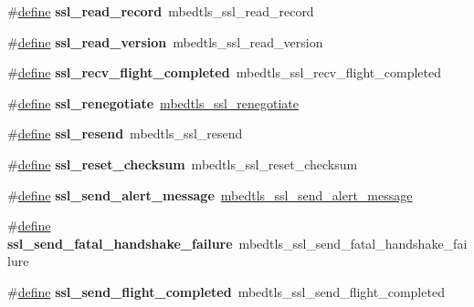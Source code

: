 \begin{DoxyCompactItemize}
\#\hyperlink{structdefine}{define} {\bfseries ssl\+\_\+read\+\_\+record}~mbedtls\+\_\+ssl\+\_\+read\+\_\+record
\item 
\mbox{\label{compat-1_83_8h_a5a530fd9e5a802238029b30f8ab7d2c8}} 
\#\hyperlink{structdefine}{define} {\bfseries ssl\+\_\+read\+\_\+version}~mbedtls\+\_\+ssl\+\_\+read\+\_\+version
\item 
\mbox{\label{compat-1_83_8h_a0368a3c941155088d189afef6c555a60}} 
\#\hyperlink{structdefine}{define} {\bfseries ssl\+\_\+recv\+\_\+flight\+\_\+completed}~mbedtls\+\_\+ssl\+\_\+recv\+\_\+flight\+\_\+completed
\item 
\mbox{\label{compat-1_83_8h_a5ab1cb88ad4ce08d9862dae7435a0348}} 
\#\hyperlink{structdefine}{define} {\bfseries ssl\+\_\+renegotiate}~\hyperlink{ssl_8h_a49b7a27a616495d5f0a4fabc3f550dbb}{mbedtls\+\_\+ssl\+\_\+renegotiate}
\item 
\mbox{\label{compat-1_83_8h_a70d8b31b1c74670701e22c3bbeffc563}} 
\#\hyperlink{structdefine}{define} {\bfseries ssl\+\_\+resend}~mbedtls\+\_\+ssl\+\_\+resend
\item 
\mbox{\label{compat-1_83_8h_a1b69f2a851cbe70085c7c83d7d9c43ef}} 
\#\hyperlink{structdefine}{define} {\bfseries ssl\+\_\+reset\+\_\+checksum}~mbedtls\+\_\+ssl\+\_\+reset\+\_\+checksum
\item 
\mbox{\label{compat-1_83_8h_a8aef4bce934b4f7b063b65c09a9e0140}} 
\#\hyperlink{structdefine}{define} {\bfseries ssl\+\_\+send\+\_\+alert\+\_\+message}~\hyperlink{ssl_8h_a431e67252731a34bd9b5f2c9222f4c43}{mbedtls\+\_\+ssl\+\_\+send\+\_\+alert\+\_\+message}
\item 
\mbox{\label{compat-1_83_8h_ac9b45a114225380f6fe489ae83b9268b}} 
\#\hyperlink{structdefine}{define} {\bfseries ssl\+\_\+send\+\_\+fatal\+\_\+handshake\+\_\+failure}~mbedtls\+\_\+ssl\+\_\+send\+\_\+fatal\+\_\+handshake\+\_\+failure
\item 
\mbox{\label{compat-1_83_8h_a91ce647a676397242531011de728ae05}} 
\#\hyperlink{structdefine}{define} {\bfseries ssl\+\_\+send\+\_\+flight\+\_\+completed}~mbedtls\+\_\+ssl\+\_\+send\+\_\+flight\+\_\+completed

\end{DoxyCompactItemize}
